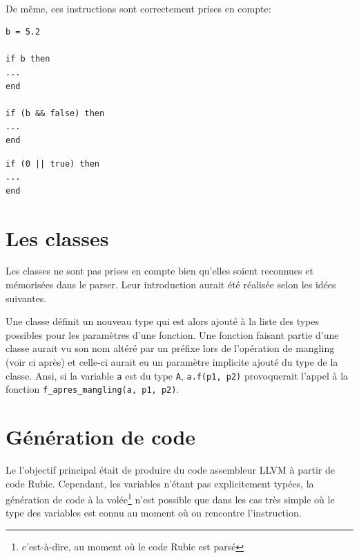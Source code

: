 \documentclass[12pt]{article}
\begin{document}
\paragraph{} De même, ces instructions sont correctement prises en compte:

\vspace{0.5cm}

\begin{minipage}{0.48\textwidth}
\begin{verbatim}
b = 5.2

if b then
...
end

if (b && false) then
...
end
\end{verbatim}
\end{minipage}
\begin{minipage}{0.48\textwidth}
\begin{verbatim}
if (0 || true) then
...
end
\end{verbatim}
\end{minipage}

\vspace{0.5cm}


\section{Les classes}

Les classes ne sont pas prises en compte bien qu'elles soient reconnues et mémorisées dans le parser. Leur introduction aurait été réalisée selon les idées suivantes.

Une classe définit un nouveau type qui est alors ajouté à la liste des types possibles pour les paramètres d'une fonction. Une fonction faisant partie d'une classe aurait vu son nom altéré par un préfixe lors de l'opération de mangling (voir ci après) et celle-ci aurait eu un paramètre implicite ajouté du type de la classe. Ansi, si la variable \verb!a! est du type \verb!A!, \verb!a.f(p1, p2)! provoquerait l'appel à la fonction \verb!f_apres_mangling(a, p1, p2)!.

\section{Génération de code}

Le l'objectif principal était de produire du code assembleur LLVM à partir de code Rubic. Cependant, les variables n'étant pas explicitement typées, la génération de code à la volée\footnote{c'est-à-dire, au moment où le code Rubic est parsé} n'est possible que dans les cas très simple où le type des variables est connu au moment où on rencontre l'instruction.
\end{document}
